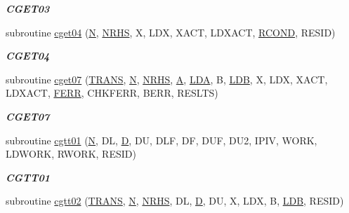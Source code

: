 \begin{DoxyCompactItemize}
\begin{DoxyCompactList}\small\item\em {\bfseries C\+G\+E\+T03} \end{DoxyCompactList}\item 
subroutine \hyperlink{group__complex__lin_ga2904353777dcb02af9fcc267415ca73c}{cget04} (\hyperlink{polmisc_8c_a0240ac851181b84ac374872dc5434ee4}{N}, \hyperlink{example__user_8c_aa0138da002ce2a90360df2f521eb3198}{N\+R\+H\+S}, X, L\+D\+X, X\+A\+C\+T, L\+D\+X\+A\+C\+T, \hyperlink{superlu__enum__consts_8h_af00a42ecad444bbda75cde1b64bd7e72a9b5c151728d8512307565994c89919d5}{R\+C\+O\+N\+D}, R\+E\+S\+I\+D)
\begin{DoxyCompactList}\small\item\em {\bfseries C\+G\+E\+T04} \end{DoxyCompactList}\item 
subroutine \hyperlink{group__complex__lin_ga98fd95a62f6bfef5e140e4f447a81770}{cget07} (\hyperlink{superlu__enum__consts_8h_a0c4e17b2d5cea33f9991ccc6a6678d62a1f61e3015bfe0f0c2c3fda4c5a0cdf58}{T\+R\+A\+N\+S}, \hyperlink{polmisc_8c_a0240ac851181b84ac374872dc5434ee4}{N}, \hyperlink{example__user_8c_aa0138da002ce2a90360df2f521eb3198}{N\+R\+H\+S}, \hyperlink{classA}{A}, \hyperlink{example__user_8c_ae946da542ce0db94dced19b2ecefd1aa}{L\+D\+A}, B, \hyperlink{example__user_8c_a50e90a7104df172b5a89a06c47fcca04}{L\+D\+B}, X, L\+D\+X, X\+A\+C\+T, L\+D\+X\+A\+C\+T, \hyperlink{superlu__enum__consts_8h_af00a42ecad444bbda75cde1b64bd7e72a78fd14d7abebae04095cfbe02928f153}{F\+E\+R\+R}, C\+H\+K\+F\+E\+R\+R, B\+E\+R\+R, R\+E\+S\+L\+T\+S)
\begin{DoxyCompactList}\small\item\em {\bfseries C\+G\+E\+T07} \end{DoxyCompactList}\item 
subroutine \hyperlink{group__complex__lin_gab94a967c9a9fdfe142ba3becfa9db160}{cgtt01} (\hyperlink{polmisc_8c_a0240ac851181b84ac374872dc5434ee4}{N}, D\+L, \hyperlink{odrpack_8h_a7dae6ea403d00f3687f24a874e67d139}{D}, D\+U, D\+L\+F, D\+F, D\+U\+F, D\+U2, I\+P\+I\+V, W\+O\+R\+K, L\+D\+W\+O\+R\+K, R\+W\+O\+R\+K, R\+E\+S\+I\+D)
\begin{DoxyCompactList}\small\item\em {\bfseries C\+G\+T\+T01} \end{DoxyCompactList}\item 
subroutine \hyperlink{group__complex__lin_ga6c4bcd90af8f60fdf275d9f416e10366}{cgtt02} (\hyperlink{superlu__enum__consts_8h_a0c4e17b2d5cea33f9991ccc6a6678d62a1f61e3015bfe0f0c2c3fda4c5a0cdf58}{T\+R\+A\+N\+S}, \hyperlink{polmisc_8c_a0240ac851181b84ac374872dc5434ee4}{N}, \hyperlink{example__user_8c_aa0138da002ce2a90360df2f521eb3198}{N\+R\+H\+S}, D\+L, \hyperlink{odrpack_8h_a7dae6ea403d00f3687f24a874e67d139}{D}, D\+U, X, L\+D\+X, B, \hyperlink{example__user_8c_a50e90a7104df172b5a89a06c47fcca04}{L\+D\+B}, R\+E\+S\+I\+D)

\end{DoxyCompactItemize}
